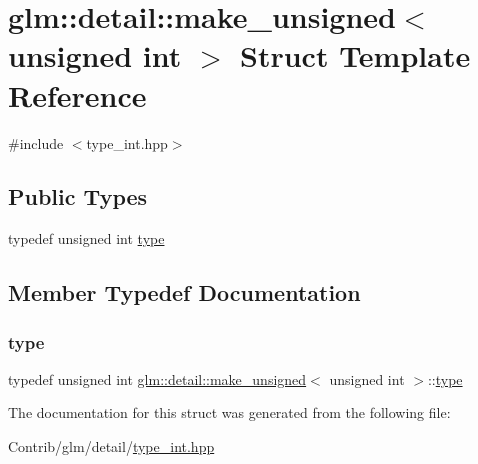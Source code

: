 \hypertarget{structglm_1_1detail_1_1make__unsigned_3_01unsigned_01int_01_4}{}\section{glm\+:\+:detail\+:\+:make\+\_\+unsigned$<$ unsigned int $>$ Struct Template Reference}
\label{structglm_1_1detail_1_1make__unsigned_3_01unsigned_01int_01_4}


{\ttfamily \#include $<$type\+\_\+int.\+hpp$>$}

\subsection*{Public Types}
\begin{DoxyCompactItemize}
\item 
typedef unsigned int \mbox{\hyperlink{structglm_1_1detail_1_1make__unsigned_3_01unsigned_01int_01_4_aea3e796456b317dd2247889d3fbb9d68}{type}}
\end{DoxyCompactItemize}


\subsection{Member Typedef Documentation}
\mbox{\label{structglm_1_1detail_1_1make__unsigned_3_01unsigned_01int_01_4_aea3e796456b317dd2247889d3fbb9d68}} 
\subsubsection{\texorpdfstring{type}{type}}
{\footnotesize\ttfamily typedef unsigned int \mbox{\hyperlink{structglm_1_1detail_1_1make__unsigned}{glm\+::detail\+::make\+\_\+unsigned}}$<$ unsigned int $>$\+::\mbox{\hyperlink{structglm_1_1detail_1_1make__unsigned_3_01unsigned_01int_01_4_aea3e796456b317dd2247889d3fbb9d68}{type}}}



The documentation for this struct was generated from the following file\+:\begin{DoxyCompactItemize}
\item 
Contrib/glm/detail/\mbox{\hyperlink{type__int_8hpp}{type\+\_\+int.\+hpp}}\end{DoxyCompactItemize}
